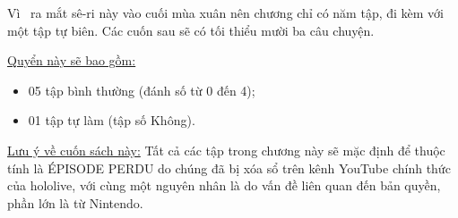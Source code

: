 \documentclass[main.tex]{subfiles}
\begin{document}
Vì \hll\ ra mắt sê-ri này vào cuối mùa xuân nên chương chỉ có năm tập, đi kèm với một tập tự biên. Các cuốn sau sẽ có tối thiểu mười ba câu chuyện.

\uline{Quyển này sẽ bao gồm:}
\begin{itemize}
    \item 05 tập bình thường (đánh số từ 0 đến 4);
    \item 01 tập tự làm (tập số Không).
\end{itemize}

\uline{Lưu ý về cuốn sách này:} Tất cả các tập trong chương này sẽ mặc định để thuộc tính là {\flaregothic ÉPISODE PERDU} do chúng đã bị xóa sổ trên kênh YouTube chính thức của hololive, với cùng một nguyên nhân là do vấn đề liên quan đến bản quyền, phần lớn là từ Nintendo.
\end{document}
